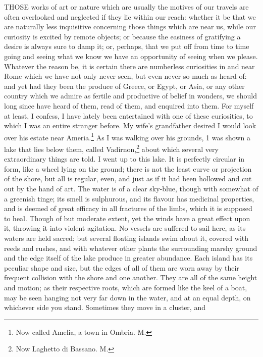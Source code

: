 
THOSE works of art or nature which are usually the motives of our travels
are often overlooked and neglected if they lie within our reach: whether
it be that we are naturally less inquisitive concerning those things which
are near us, while our curiosity is excited by remote objects; or because
the easiness of gratifying a desire is always sure to damp it; or,
perhaps, that we put off from time to time going and seeing what we know
we have an opportunity of seeing when we please. Whatever the reason be,
it is certain there are numberless curiosities in and near Rome which we
have not only never seen, but even never so much as heard of: and yet had
they been the produce of Greece, or Egypt, or Asia, or any other country
which we admire as fertile and productive of belief in wonders, we should
long since have heard of them, read of them, and enquired into them. For
myself at least, I confess, I have lately been entertained with one of
these curiosities, to which I was an entire stranger before. My wife's
grandfather desired I would look over his estate near Ameria.\footnote{Now called Amelia, a
town in Ombria. M.}
As I was walking over his grounds, 1 was shown a lake that lies below
them, called Vadirnon,\footnote{Now Laghetto di
Bassano. M.} about which several very extraordinary
things are told. I went up to this lake. It is perfectly circular in form,
like a wheel lying on the ground; there is not the least curve or
projection of the shore, but all is regular, even, and just as if it had
been hollowed and cut out by the hand of art. The water is of a clear
sky-blue, though with somewhat of a greenish tinge; its smell is
sulphurous, and its flavour has medicinal properties, and is deemed of
great efficacy in all fractures of the limbs, which it is supposed to
heal. Though of but moderate extent, yet the winds have a great effect
upon it, throwing it into violent agitation. No vessels are suffered to
sail here, as its waters are held sacred; but several floating islands
swim about it, covered with reeds and rushes, and with whatever other
plants the surrounding marshy ground and the edge itself of the lake
produce in greater abundance. Each island has its peculiar shape and size,
but the edges of all of them are worn away by their frequent collision
with the shore and one another. They are all of the same height and
motion; as their respective roots, which are formed like the keel of a
boat, may be seen hanging not very far down in the water, and at an equal
depth, on whichever side you stand. Sometimes they move in a cluster, and
